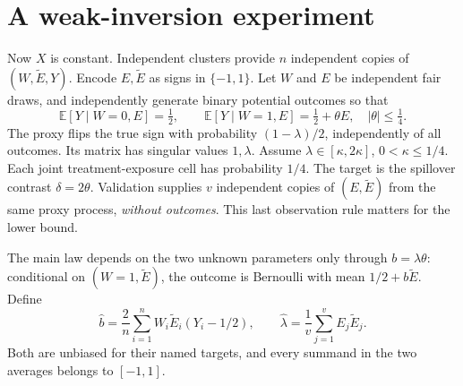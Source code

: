 \documentclass[11pt,a4paper]{article}
\theoremstyle{definition}
\theoremstyle{remark}
\newcommand{\E}{\mathbb{E}}
\begin{document}
\section{A weak-inversion experiment}
Now $X$ is constant. Independent clusters provide $n$ independent copies of $(W,\widetilde E,Y)$. Encode $E,\widetilde E$ as signs in $\{-1,1\}$. Let $W$ and $E$ be independent fair draws, and independently generate binary potential outcomes so that
\[
 \E[Y\mid W=0,E]=\tfrac12,\qquad
 \E[Y\mid W=1,E]=\tfrac12+\theta E,\quad |\theta|\leq\tfrac14.
\]
The proxy flips the true sign with probability $(1-\lambda)/2$, independently of all outcomes. Its matrix has singular values $1,\lambda$. Assume $\lambda\in[\kappa,2\kappa]$, $0<\kappa\leq1/4$. Each joint treatment-exposure cell has probability $1/4$. The target is the spillover contrast $\delta=2\theta$. Validation supplies $v$ independent copies of $(E,\widetilde E)$ from the same proxy process, \emph{without outcomes}. This last observation rule matters for the lower bound.

The main law depends on the two unknown parameters only through $b=\lambda\theta$: conditional on $(W=1,\widetilde E)$, the outcome is Bernoulli with mean $1/2+b\widetilde E$. Define
\[
 \widehat b=\frac2n\sum_{i=1}^n W_i\widetilde E_i(Y_i-1/2),\qquad
 \widehat\lambda=\frac1v\sum_{j=1}^v E_j\widetilde E_j.
\]
Both are unbiased for their named targets, and every summand in the two averages belongs to $[-1,1]$.
\end{document}
